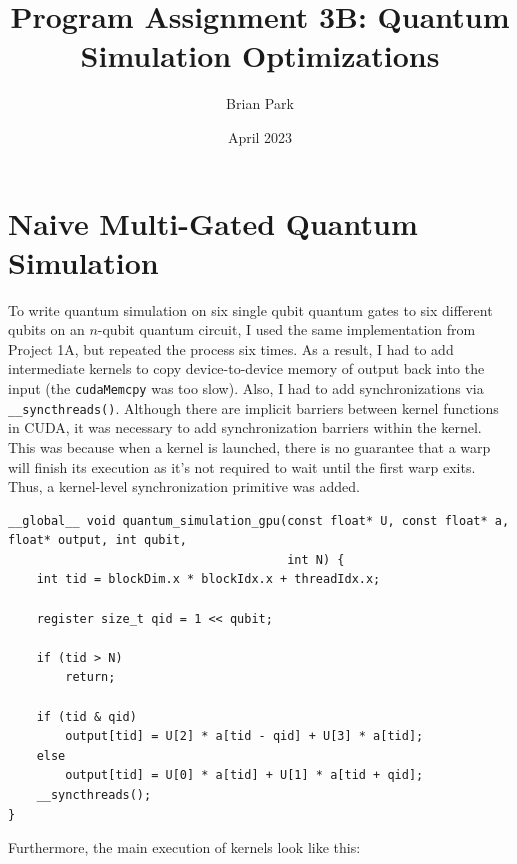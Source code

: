 \documentclass{article}
\title{Program Assignment 3B: Quantum Simulation Optimizations}
\author{Brian Park}
\affil{North Carolina State University, Computer Engineering 786}
\date{April 2023}
\begin{document}
\maketitle

\section{Naive Multi-Gated Quantum Simulation}
To write quantum simulation on six single qubit quantum gates to six different qubits on an $n$-qubit quantum circuit, I used the same implementation from Project 1A, but repeated the process six times. As a result, I had to add intermediate kernels to copy device-to-device memory of output back into the input (the \verb|cudaMemcpy| was too slow). Also, I had to add synchronizations via \verb|__syncthreads()|. Although there are implicit barriers between kernel functions in CUDA, it was necessary to add synchronization barriers within the kernel. This was because when a kernel is launched, there is no guarantee that a warp will finish its execution as it's not required to wait until the first warp exits. Thus, a kernel-level synchronization primitive was added.

\begin{verbatim}
__global__ void quantum_simulation_gpu(const float* U, const float* a, float* output, int qubit,
                                       int N) {
    int tid = blockDim.x * blockIdx.x + threadIdx.x;

    register size_t qid = 1 << qubit;

    if (tid > N)
        return;

    if (tid & qid)
        output[tid] = U[2] * a[tid - qid] + U[3] * a[tid];
    else
        output[tid] = U[0] * a[tid] + U[1] * a[tid + qid];
    __syncthreads();
}
\end{verbatim}

Furthermore, the main execution of kernels look like this:
\end{document}
